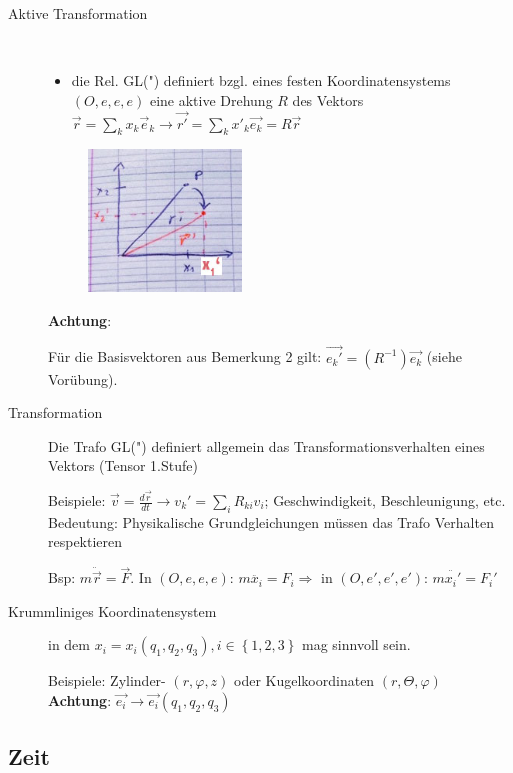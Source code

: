 \begin{description}
\item[Aktive Transformation]~\par
\begin{itemize}
\item die Rel. GL(") definiert bzgl. eines festen Koordinatensystems
  $(O,e,e,e)$ eine aktive Drehung $R$ des Vektors
  $\vec{r}=\sum_k x_k\vec{e}_k \rightarrow \vec{r'}=\sum_k
  x'_k\vec{e_k}=R\vec{r}$
\end{itemize}
\begin{figure}[h]
\begin{center}
\includegraphics[width=0.4\textwidth]{Skizzen/Anhang11.jpg}
\end{center}
\caption{}
\end{figure}
\textbf{Achtung}:

Für die Basisvektoren aus Bemerkung 2 gilt: $\vec{e_k'}=(R^{-1})\vec{e_k}$ (siehe Vorübung).
\item[Transformation] Die Trafo GL(") definiert allgemein das Transformationsverhalten eines Vektors (Tensor 1.Stufe)

Beispiele: 
$\vec{v}=\frac{d\vec{r}}{dt} \rightarrow v_k'=\sum_iR_{ki}v_i$; Geschwindigkeit, Beschleunigung, etc.\\
Bedeutung: Physikalische Grundgleichungen müssen das Trafo Verhalten respektieren

Bsp: $m\ddot{\vec{r}}=\vec{F}$. In $(O,e,e,e)$: $m\ddot{x_i}=F_i \Rightarrow$ in $(O,e',e',e')$: $m\ddot{x_i'}=F_i'$
\item[Krummliniges Koordinatensystem] in dem $x_i=x_i(q_1,q_2,q_3),i \in \left\{ 1,2,3 \right\}$ mag sinnvoll sein.

Beispiele: Zylinder- $(r, \varphi, z)$ oder Kugelkoordinaten $(r, \Theta, \varphi)$\\
\textbf{Achtung}: $\vec{e_i}\rightarrow\vec{e_i}(q_1,q_2,q_3)$
\end{description}

\subsection{Zeit}
